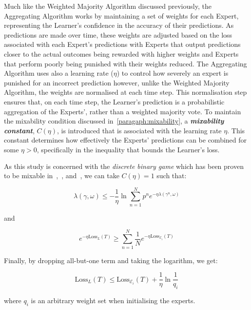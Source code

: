 Much like the Weighted Majority Algorithm discussed previously, the Aggregating Algorithm works by maintaining a set of weights for each Expert, representing the Learner's confidence in the accuracy of their predictions. As predictions are made over time, these weights are adjusted based on the loss associated with each Expert's predictions with Experts that output predictions closer to the actual outcomes being rewarded with higher weights and Experts that perform poorly being punished with their weights reduced. The Aggregating Algorithm uses also a learning rate ($\eta$) to control how severely an expert is punished for an incorrect prediction however, unlike the Weighted Majority Algorithm, the weights are normalised at each time step. This normalisation step ensures that, on each time step, the Learner's prediction is a probabilistic aggregation of the Experts', rather than a weighted majority vote. To maintain the mixability condition discussed in~\ref{paragaph:mixability}, a \textbf{\textit{mixability constant}}, $C(\eta)$, is introduced that is associated with the learning rate $\eta$. This constant determines how effectively the Experts' predictions can be combined for some $\eta > 0$, specifically in the inequality that bounds the Learner's loss.

As this study is concerned with the \textit{discrete binary game} which has been proven to be mixable in~\cite{vovk:2001},~\cite{kalnishkan/vyugin:2008}, and~\cite{kalnishkan:2022}, we can take $C(\eta) = 1$ such that:

\begin{equation}
    \lambda(\gamma,\omega) \leq -\frac{1}{\eta}\ln\underset{n=1}{\overset{N}{\sum}}p^ne^{-\eta\lambda(\gamma^n, \omega)}
\end{equation}

and

\begin{equation}
    e^{-\eta\text{Loss}_L(T)} \geq \underset{n=1}{\overset{N}{\sum}}\frac{1}{N}e^{-\eta\text{Loss}_{\mathcal{E}_i}(T)}
\end{equation}

\noindent Finally, by dropping all-but-one term and taking the logarithm, we get: 

\begin{equation}
    \text{Loss}_L(T) \leq \text{Loss}_{\mathcal{E}_i}(T) + \frac{1}{\eta}\ln\frac{1}{q_i}
\end{equation}

where $q_i$ is an arbitrary weight set when initialising the experts.

